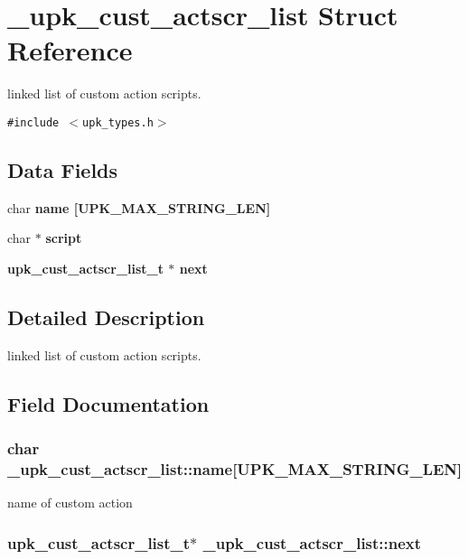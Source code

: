 \section{\_\-upk\_\-cust\_\-actscr\_\-list Struct Reference}
\label{struct__upk__cust__actscr__list}
linked list of custom action scripts.  


{\tt \#include $<$upk\_\-types.h$>$}

\subsection*{Data Fields}
\begin{CompactItemize}
\item 
char \bf{name} [UPK\_\-MAX\_\-STRING\_\-LEN]
\item 
char $\ast$ \bf{script}
\item 
\bf{upk\_\-cust\_\-actscr\_\-list\_\-t} $\ast$ \bf{next}
\end{CompactItemize}


\subsection{Detailed Description}
linked list of custom action scripts. 



\subsection{Field Documentation}
\subsubsection{\setlength{\rightskip}{0pt plus 5cm}char \bf{\_\-upk\_\-cust\_\-actscr\_\-list::name}[UPK\_\-MAX\_\-STRING\_\-LEN]}\label{struct__upk__cust__actscr__list_4e891c43327bd7270c0bf5895ef4ca31}


name of custom action 
\subsubsection{\setlength{\rightskip}{0pt plus 5cm}\bf{upk\_\-cust\_\-actscr\_\-list\_\-t}$\ast$ \bf{\_\-upk\_\-cust\_\-actscr\_\-list::next}}\label{struct__upk__cust__actscr__list_fa4faec8064c2f2cecb01ce9182f9970}


